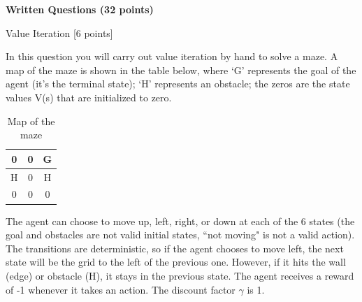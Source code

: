 \documentclass[11pt,addpoints,answers]{exam}
\begin{document}
\clearpage

{\LARGE \bf Written Questions (32 points)}
\begin{questions}
\label{sec:warmup}
{\Large \question Value Iteration [6 points]}

In this question you will carry out value iteration by hand to solve a maze. A map of the maze is shown in the table below, where `G' represents the goal of the agent (it's the terminal state); `H' represents an obstacle; the zeros are the state values V(s) that are initialized to zero.

\begin{table}[H]
\begin{center}
  \begin{tabular}{ | c | c | c | }
    \hline
    0 & 0 & G\\ \hline
    H & 0 & H \\ \hline
    0 & 0 & 0 \\ \hline
  \end{tabular}
 \caption{Map of the maze}
\end{center}
\end{table}

The agent can choose to move up, left, right, or down at each of the 6 states (the goal and obstacles are not valid initial states, ``not moving" is not a valid action). The transitions are deterministic, so if the agent chooses to move left, the next state will be the grid to the left of the previous one. However, if it hits the wall (edge) or obstacle (H), it stays in the previous state. The agent receives a reward of -1 whenever it takes an action. The discount factor $\gamma$ is 1.

\end{questions}
\end{document}
